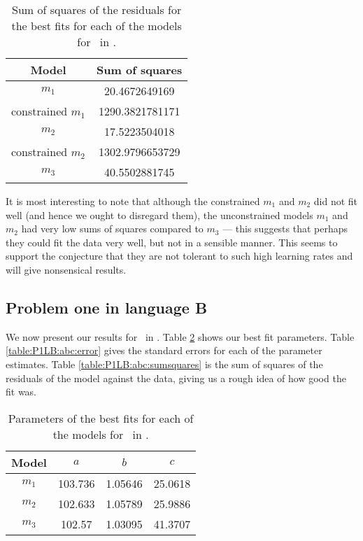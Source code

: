 \begin{table}[ht!]
\centering
\begin{tabular}{|c|c|}
\hline
{\bf Model} & Sum of squares \\
\hline
$m_1$ & 20.4672649169\\
\hline
constrained $m_1$ & 1290.3821781171\\
\hline
$m_2$ & 17.5223504018\\
\hline
constrained $m_2$ & 1302.9796653729\\
\hline
$m_3$ & 40.5502881745 \\
\hline
\end{tabular}
\caption{Sum of squares of the residuals for the best fits for each of the models for \PO\ in \LA.}
\label{table:P1LA:abc:sumsquares}
\end{table}

It is most interesting to note that although the constrained $m_1$ and $m_2$ did
not fit well (and hence we ought to disregard them),
the unconstrained models $m_1$ and $m_2$ had very low sums of
squares compared to $m_3$ --- this suggests that perhaps they could fit the data
very well, but not in a sensible manner.
This seems to support the conjecture that they are not tolerant to such high
learning rates and will give nonsensical results.

\subsection{Problem one in language B} \label{subsecP1LB}

We now present our results for \PO\ in \LB.
Table \ref{table:P1LB:abc} shows our best fit parameters.
Table \ref{table:P1LB:abc:error} gives the standard errors for each of the
parameter estimates.
Table \ref{table:P1LB:abc:sumsquares} is the sum of squares of the residuals of
the model against the data, giving us a rough idea of how good the fit was.

\begin{table}[ht!]
\centering
\begin{tabular}{|c|c|c|c|}
\hline
{\bf Model} &  $a$ & $b$ & $c$ \\
\hline
$m_1$ & 103.736 & 1.05646 & 25.0618 \\
\hline
$m_2$ & 102.633 & 1.05789 & 25.9886\\
\hline
$m_3$ & 102.57 & 1.03095 & 41.3707 \\
\hline
\end{tabular}
\caption{Parameters of the best fits for each of the models for \PO\ in \LB.}
\label{table:P1LB:abc}
\end{table}

